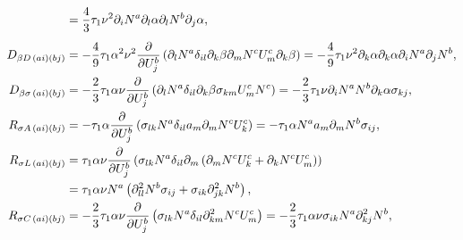 \begin{align}
                               & = \vphantom{\frac{\partial }{\partial U_j^b}} \frac{4}{3} \tau_1 \nu^2 \partial_i N^a \partial_l \alpha \partial_l N^b \partial_j \alpha, \label{eq:DBetaGLHSStabilizationTerm}                                                                                                                                                                                                        \\
  D_{\beta D \, (ai)(bj)}      & = -\frac{4}{9} \tau_1 \alpha^2 \nu^2 \frac{\partial }{\partial U_j^b} \left( \partial_l N^a \delta_{il} \partial_k \beta \partial_m N^c U_m^c \partial_k \beta \right) = -\frac{4}{9} \tau_1 \nu^2 \partial_k \alpha \partial_k \alpha \partial_i N^a \partial_j N^b, \label{eq:DBetaDLHSStabilizationTerm}                                                                            \\
  D_{\beta \sigma \, (ai)(bj)} & = - \frac{2}{3} \tau_1 \alpha \nu \frac{\partial }{\partial U_j^b} \left( \partial_l N^a \delta_{il} \partial_k \beta \sigma_{km} U_m^c N^c \right) = - \frac{2}{3} \tau_1 \nu \partial_i N^a N^b \partial_k \alpha \sigma_{kj}, \label{eq:DBetaSigmaLHSStabilizationTerm}                                                                                                                                                                                                                                                   \\
  R_{\sigma A\, (ai)(bj)} & = - \tau_1 \alpha \frac{\partial }{\partial U_j^b} \left( \sigma_{lk} N^a \delta_{il} a_m \partial_m N^c U_k^c \right) = - \tau_1 \alpha N^a a_m \partial_m N^b \sigma_{ij}, \label{eq:RSigmaALHSStabilizationTerm}                                                  \\
  R_{\sigma L\, (ai)(bj)} & = \tau_1 \alpha \nu \frac{\partial }{\partial U_j^b} \left( \sigma_{lk} N^a \delta_{il} \partial_m \left( \partial_m N^c U_k^c + \partial_k N^c U_m^c \right) \right) \notag                                                                                         \\
                          & = \tau_1 \alpha \nu N^a \left( \partial_{ll}^2 N^b \sigma_{ij} + \sigma_{ik} \partial_{jk}^2 N^b \right), \label{eq:RSigmaLLHSStabilizationTerm}                                                                                                                     \\
  R_{\sigma C\, (ai)(bj)} & = - \frac{2}{3} \tau_1 \alpha \nu \frac{\partial }{\partial U_j^b} \left( \sigma_{lk}N^a \delta_{il} \partial_{km}^2 N^c U_m^c \right) = - \frac{2}{3} \tau_1 \alpha \nu \sigma_{ik} N^a \partial_{kj}^2 N^b, \label{eq:RSigmaCLHSStabilizationTerm}                 \\

\end{align}
